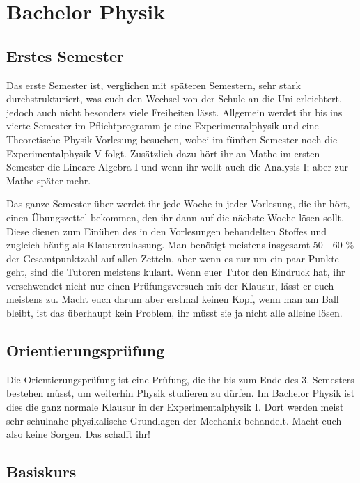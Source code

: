 \section{Bachelor Physik}

\subsection{Erstes Semester}

Das erste Semester ist, verglichen mit späteren Semestern, sehr stark durchstrukturiert, was euch den Wechsel von der Schule an die Uni erleichtert, jedoch auch nicht besonders viele Freiheiten lässt.  Allgemein werdet ihr bis ins vierte Semester im Pflichtprogramm je eine Experimentalphysik und eine Theoretische Physik Vorlesung besuchen, wobei im fünften Semester noch die Experimentalphysik V folgt. Zusätzlich dazu hört ihr an Mathe im ersten Semester die Lineare Algebra I und wenn ihr wollt auch die Analysis I; aber zur Mathe später mehr.

Das ganze Semester über werdet ihr jede Woche in jeder Vorlesung, die ihr hört, einen Übungszettel bekommen, den ihr dann auf die nächste Woche lösen sollt. Diese dienen zum Einüben des in den Vorlesungen behandelten Stoffes und zugleich häufig als Klausurzulassung. Man benötigt meistens insgesamt 50 - 60 \% der Gesamtpunktzahl auf allen Zetteln, aber wenn es nur um ein paar Punkte geht, sind die Tutoren meistens kulant. Wenn euer Tutor den Eindruck hat, ihr verschwendet nicht nur einen Prüfungsversuch mit der Klausur, lässt er euch meistens zu. Macht euch darum aber erstmal keinen Kopf, wenn man am Ball bleibt, ist das überhaupt kein Problem, ihr müsst sie ja nicht alle alleine lösen.

\subsection{Orientierungsprüfung}

Die Orientierungsprüfung ist eine Prüfung, die ihr bis zum Ende des 3. Semesters bestehen müsst, um weiterhin Physik studieren zu dürfen. Im Bachelor Physik ist dies die ganz normale Klausur in der Experimentalphysik I. Dort werden meist sehr schulnahe physikalische Grundlagen der Mechanik behandelt. Macht euch also keine Sorgen. Das schafft ihr!

\subsection{Basiskurs}

